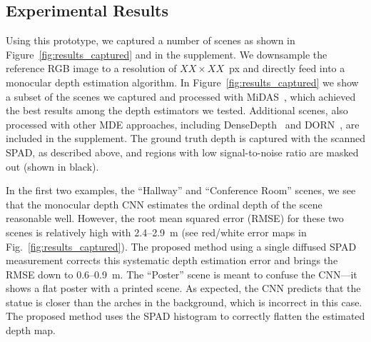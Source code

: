 %

\subsection{Experimental Results}

Using this prototype, we captured a number of scenes as shown in Figure~\ref{fig:results_captured} and in the supplement. We downsample the reference RGB image to a resolution of $XX \times XX$~px and directly feed into a monocular depth estimation algorithm. In Figure~\ref{fig:results_captured} we show a subset of the scenes we captured and processed with MiDAS~\cite{Lasinger:2019}, which achieved the best results among the depth estimators we tested. Additional scenes, also processed with other MDE approaches, including DenseDepth~\cite{Alhashim2018} and DORN~\cite{Fu2018}, are included in the supplement. The ground truth depth is captured with the scanned SPAD, as described above, and regions with low signal-to-noise ratio are masked out (shown in black).

In the first two examples, the ``Hallway'' and ``Conference Room'' scenes, we see that the monocular depth CNN estimates the ordinal depth of the scene reasonable well. However, the root mean squared error (RMSE) for these two scenes is relatively high with 2.4--2.9~m (see red/white error maps in Fig.~\ref{fig:results_captured}). The proposed method using a single diffused SPAD measurement corrects this systematic depth estimation error and brings the RMSE down to 0.6--0.9~m. The ``Poster'' scene is meant to confuse the CNN---it shows a flat poster with a printed scene. As expected, the CNN predicts that the statue is closer than the arches in the background, which is incorrect in this case. The proposed method uses the SPAD histogram to correctly flatten the estimated depth map. 

